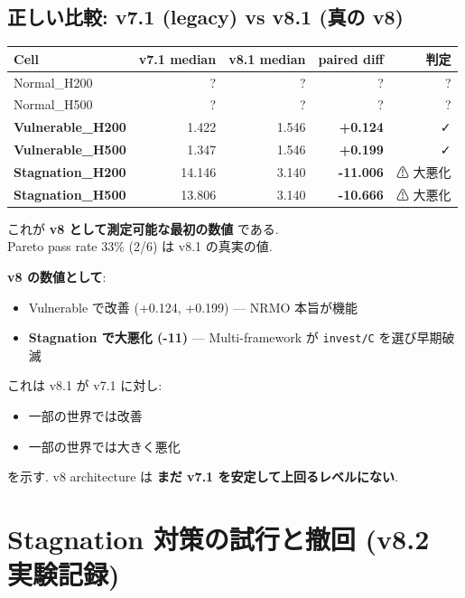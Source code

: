 \documentclass[a4paper,11pt]{report}
\begin{document}
\section{正しい比較: v7.1 (legacy) vs v8.1 (真の v8)}

\begin{longtable}{l r r r r}
\toprule
Cell & v7.1 median & v8.1 median & paired diff & 判定 \\
\midrule
Normal\_H200 & ? & ? & ? & ? \\
Normal\_H500 & ? & ? & ? & ? \\
\textbf{Vulnerable\_H200} & 1.422 & 1.546 & \textcolor{success}{\textbf{+0.124}} & ✓ \\
\textbf{Vulnerable\_H500} & 1.347 & 1.546 & \textcolor{success}{\textbf{+0.199}} & ✓ \\
\textbf{Stagnation\_H200} & 14.146 & 3.140 & \textcolor{warning}{\textbf{-11.006}} & ⚠ 大悪化 \\
\textbf{Stagnation\_H500} & 13.806 & 3.140 & \textcolor{warning}{\textbf{-10.666}} & ⚠ 大悪化 \\
\bottomrule
\end{longtable}

これが \textbf{v8 として測定可能な最初の数値} である.\\
Pareto pass rate 33\% (2/6) は v8.1 の真実の値.

\begin{honest}
\textbf{v8 の数値として}:

\begin{itemize}[leftmargin=*]
  \item Vulnerable で改善 (+0.124, +0.199) — NRMO 本旨が機能
  \item \textbf{Stagnation で大悪化 (-11)} — Multi-framework が \texttt{invest/C} を選び早期破滅
\end{itemize}

これは v8.1 が v7.1 に対し:
\begin{itemize}[leftmargin=*]
  \item 一部の世界では改善
  \item 一部の世界では大きく悪化
\end{itemize}
を示す. v8 architecture は \textbf{まだ v7.1 を安定して上回るレベルにない}.
\end{honest}

\chapter{Stagnation 対策の試行と撤回 (v8.2 実験記録)}
\end{document}
